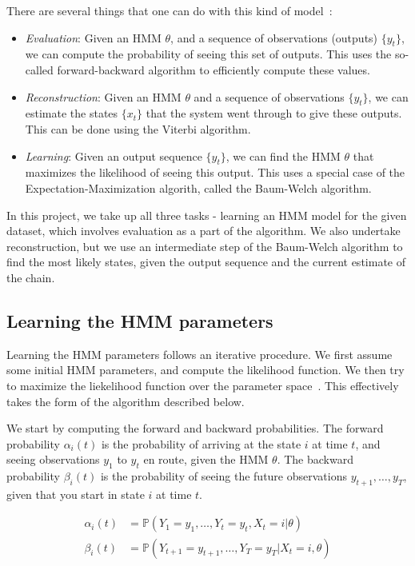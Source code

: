 \documentclass[11pt, twoside]{article}
\begin{document}
There are several things that one can do with this kind of model~\cite{internettraffichmmmodelingpaper}:
\begin{itemize}
	\item \emph{Evaluation}: Given an HMM $\theta$, and a sequence of observations (outputs) $\{y_t\}$, we can compute the probability of seeing this set of outputs. This uses the so-called forward-backward algorithm to efficiently compute these values.
	\item \emph{Reconstruction}: Given an HMM $\theta$ and a sequence of observations $\{y_t\}$, we can estimate the states $\{x_t\}$ that the system went through to give these outputs. This can be done using the Viterbi algorithm.
	\item \emph{Learning}: Given an output sequence $\{y_t\}$, we can find the HMM $\theta$ that maximizes the likelihood of seeing this output. This uses a special case of the Expectation-Maximization algorith, called the Baum-Welch algorithm.
\end{itemize}

In this project, we take up all three tasks - learning an HMM model for the given dataset, which involves evaluation as a part of the algorithm. We also undertake reconstruction, but we use an intermediate step of the Baum-Welch algorithm to find the most likely states, given the output sequence and the current estimate of the chain.

\subsection{Learning the HMM parameters}

Learning the HMM parameters follows an iterative procedure. We first assume some initial HMM parameters, and compute the likelihood function. We then try to maximize the liekelihood function over the parameter space~\cite{pointprocesstextbook}. This effectively takes the form of the algorithm described below.

We start by computing the forward and backward probabilities. The forward probability $\alpha_i(t)$ is the probability of arriving at the state $i$ at time $t$, and seeing observations $y_1$ to $y_t$ en route, given the HMM $\theta$. The backward probability $\beta_i(t)$ is the probability of seeing the future observations $y_{t+1}, \ldots, y_T$, given that you start in state $i$ at time $t$.

\begin{align*}
	\alpha_i(t) &= \mathbb{P}(Y_1=y_1, \ldots, Y_t=y_t, X_t=i | \theta) \\
	\beta_i(t) &= \mathbb{P}(Y_{t+1}=y_{t+1}, \ldots, Y_T=y_T | X_t=i, \theta)
\end{align*}
\end{document}
